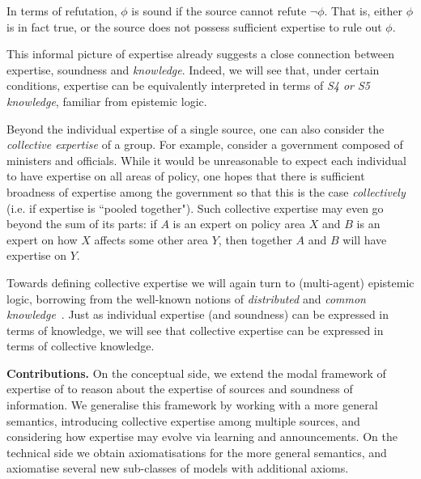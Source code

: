In terms of refutation, $\phi$ is sound if the source cannot refute $\neg\phi$.
That is, either $\phi$ is in fact true, or the source does not possess
sufficient expertise to rule out $\phi$.

This informal picture of expertise already suggests a close connection between
expertise, soundness and \emph{knowledge}. Indeed, we will see that, under
certain conditions, expertise can be equivalently interpreted in terms of
\emph{S4 or S5 knowledge}, familiar from epistemic logic.

Beyond the individual expertise of a single source, one can also consider the
\emph{collective expertise} of a group. For example, consider a government
composed of ministers and officials. While it would be unreasonable to expect
each individual to have expertise on all areas of policy, one hopes that there
is sufficient broadness of expertise among the government so that this is the
case \emph{collectively} (i.e. if expertise is ``pooled together"). Such
collective expertise may even go beyond the sum of its parts: if $A$ is an
expert on policy area $X$ and $B$ is an expert on how $X$ affects some other
area $Y$, then together $A$ and $B$ will have expertise on $Y$.

Towards defining collective expertise we will again turn to (multi-agent)
epistemic logic, borrowing from the well-known notions of \emph{distributed}
and \emph{common knowledge}~\cite{fagin2003reasoning}. Just as individual
expertise (and soundness) can be expressed in terms of knowledge, we will see
that collective expertise can be expressed in terms of collective knowledge.


\textbf{Contributions.} On the conceptual side, we extend the modal framework
of expertise of \textcite{singleton2021logic} to reason about the expertise of
sources and soundness of information. We generalise this framework by working
with a more general semantics, introducing collective expertise among
multiple sources, and considering how expertise may evolve via learning and
announcements.
%
On the technical side we obtain axiomatisations for the more general semantics,
and axiomatise several new sub-classes of models with additional axioms.

